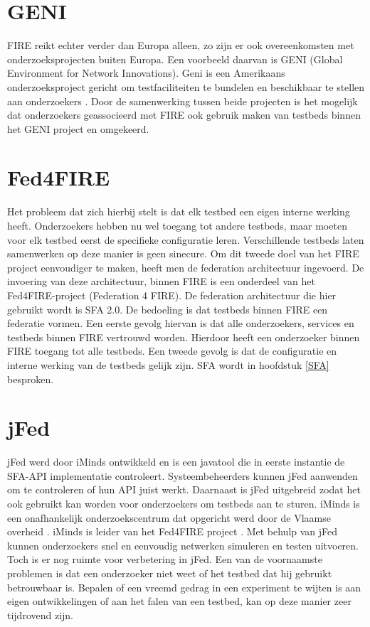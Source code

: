 \section{GENI}
\npar
FIRE reikt echter verder dan Europa alleen, zo zijn er ook overeenkomsten met onderzoeksprojecten buiten Europa. Een voorbeeld daarvan is GENI (Global Environment for Network Innovations). Geni is een Amerikaans onderzoeksproject gericht om testfaciliteiten te bundelen en beschikbaar te stellen aan onderzoekers \citep{geni-what-is}. Door de samenwerking tussen beide projecten is het mogelijk dat onderzoekers geassocieerd met FIRE ook gebruik maken van testbeds binnen het GENI project en omgekeerd.

\section{Fed4FIRE}
\npar
Het probleem dat zich hierbij stelt is dat elk testbed een eigen interne werking heeft. Onderzoekers hebben nu wel toegang tot andere testbeds, maar moeten voor elk testbed eerst de specifieke configuratie leren. Verschillende testbeds laten samenwerken op deze manier is geen sinecure. Om dit tweede doel van het FIRE project eenvoudiger te maken, heeft men de federation architectuur ingevoerd.
\npar
De invoering van deze architectuur, binnen FIRE is een onderdeel van het Fed4FIRE-project (Federation 4 FIRE). De federation architectuur die hier gebruikt wordt is SFA 2.0. De bedoeling is dat testbeds binnen FIRE een federatie vormen. Een eerste gevolg hiervan is dat alle onderzoekers, services en testbeds binnen FIRE vertrouwd worden. Hierdoor heeft een onderzoeker binnen FIRE toegang tot alle testbeds. Een tweede gevolg is dat de configuratie en interne werking van de testbeds gelijk zijn. SFA wordt in hoofdstuk \ref{SFA} besproken.

\section{jFed}
\npar
jFed werd door iMinds ontwikkeld \citep{iminds-jFed} en is een javatool die in eerste instantie de SFA-API implementatie controleert. Systeembeheerders kunnen jFed aanwenden om te controleren of hun API juist werkt. Daarnaast is jFed uitgebreid zodat het ook gebruikt kan worden voor onderzoekers om testbeds aan te sturen. iMinds is een onafhankelijk onderzoekscentrum dat opgericht werd door de Vlaamse overheid \citep{iMinds-what-is}. iMinds is leider van het Fed4FIRE project \citep{iminds-FED4FIRE}.
\npar
Met behulp van jFed kunnen onderzoekers snel en eenvoudig netwerken simuleren en testen uitvoeren. Toch is er nog ruimte voor verbetering in jFed. Een van de voornaamste problemen is dat een onderzoeker niet weet of het testbed dat hij gebruikt betrouwbaar is. Bepalen of een vreemd gedrag in een experiment te wijten is aan eigen ontwikkelingen of aan het falen van een testbed, kan op deze manier zeer tijdrovend zijn.

